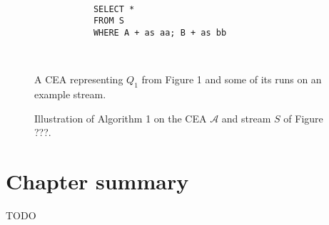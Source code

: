 \begin{figure}[H]
  \centering
  \begin{subfigure}[t]{\textwidth}
    \centering
  \end{subfigure}
  \\
  \begin{subfigure}[b]{\textwidth}
    \begin{verbatim}
      SELECT *
      FROM S
      WHERE A + as aa; B + as bb
    \end{verbatim}
  \end{subfigure}
  \\
  \begin{subfigure}[b]{\textwidth}
    \centering
  \end{subfigure}
  \caption{A CEA representing $Q_{1}$ from Figure 1 and some of its runs on an example stream.}
  \label{fig:label}
\end{figure}

\begin{figure}[H]
  \begin{subfigure}[t]{0.1\linewidth}
  \end{subfigure}
  \begin{subfigure}[t]{0.1\linewidth}
  \end{subfigure}
  \begin{subfigure}[t]{0.24\linewidth}
  \end{subfigure}
  \begin{subfigure}[t]{0.24\linewidth}
  \end{subfigure}
  \begin{subfigure}[t]{0.28\linewidth}
  \end{subfigure}
  \caption{Illustration of Algorithm 1 on the CEA $\mathcal{A}$ and stream $S$ of Figure ???.}
  \label{fig:label}
\end{figure}


\section{Chapter summary}

TODO
